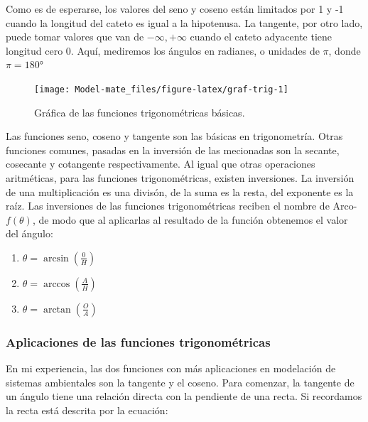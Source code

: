 \documentclass[
]{book}
\providecommand{\tightlist}{%
  \setlength{\itemsep}{0pt}\setlength{\parskip}{0pt}}
\begin{document}
Como es de esperarse, los valores del seno y coseno están limitados por 1 y -1 cuando la longitud del cateto es igual a la hipotenusa. La tangente, por otro lado, puede tomar valores que van de \(-\infty, +\infty\) cuando el cateto adyacente tiene longitud cero \(0\). Aquí, mediremos los ángulos en radianes, o unidades de \(\pi\), donde \(\pi = 180°\)

\begin{figure}

{\centering \texttt{[image: Model-mate\_files/figure-latex/graf-trig-1]} 

}

\caption{Gráfica de las funciones trigonométricas básicas.}\label{fig:graf-trig}
\end{figure}

Las funciones seno, coseno y tangente son las básicas en trigonometría. Otras funciones comunes, pasadas en la inversión de las mecionadas son la secante, cosecante y cotangente respectivamente. Al igual que otras operaciones aritméticas, para las funciones trigonométricas, existen inversiones. La inversión de una multiplicación es una divisón, de la suma es la resta, del exponente es la raíz. Las inversiones de las funciones trigonométricas reciben el nombre de Arco-\(f(\theta)\), de modo que al aplicarlas al resultado de la función obtenemos el valor del ángulo:

\begin{enumerate}
\def\labelenumi{\arabic{enumi}.}
\tightlist
\item
  \(\theta = \arcsin \left(\frac{0}{H}\right)\)
\item
  \(\theta = \arccos \left(\frac{A}{H}\right)\)
\item
  \(\theta = \arctan \left(\frac{O}{A} \right)\)
\end{enumerate}

\hypertarget{aplicaciones-de-las-funciones-trigonomuxe9tricas}{%
\subsubsection{Aplicaciones de las funciones trigonométricas}\label{aplicaciones-de-las-funciones-trigonomuxe9tricas}}

En mi experiencia, las dos funciones con más aplicaciones en modelación de sistemas ambientales son la tangente y el coseno. Para comenzar, la tangente de un ángulo tiene una relación directa con la pendiente de una recta. Si recordamos la recta está descrita por la ecuación:
\end{document}
